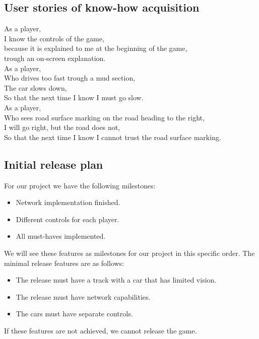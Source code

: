 \documentclass[11pt,twoside,a4paper]{article}
\begin{document}
\subsection{User stories of know-how acquisition}
As a player,\\
I know the controls of the game,\\
because it is explained to me at the beginning of the game,\\
trough an on-screen explanation.\\

\noindent
As a player,\\
Who drives too fast trough a mud section,\\
The car slows down,\\
So that the next time I know I must go slow.\\

\noindent
As a player,\\
Who sees road surface marking on the road heading to the right,\\
I will go right, but the road does not,\\
So that the next time I know I cannot trust the road surface marking.\\


\subsection{Initial release plan}
For our project we have the following milestones:

\begin{itemize}
  \item Network implementation finished.
  \item Different controls for each player.
  \item All must-haves implemented.
\end{itemize}

We will see these features as milestones for our project in this specific order. The minimal release features are as follows:

\begin{itemize}
  \item The release must have a track with a car that has limited vision.
  \item The release must have network capabilities.
  \item The cars must have separate controls.
\end{itemize}

If these features are not achieved, we cannot release the game.
\end{document}
